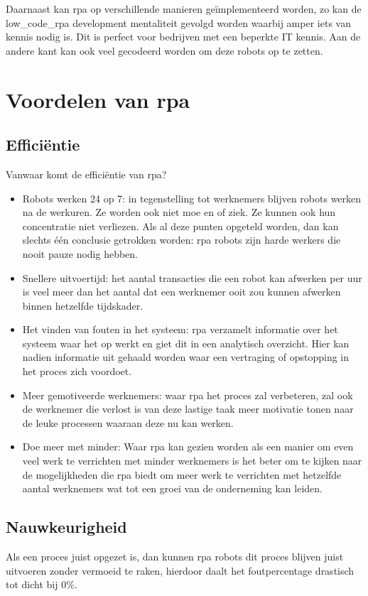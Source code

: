 Daarnaast kan \acrshort{rpa} op verschillende manieren geïmplementeerd worden, zo kan de \gls{low_code_rpa} development mentaliteit gevolgd worden waarbij amper iets van kennis nodig is. Dit is perfect voor bedrijven met een beperkte IT kennis. Aan de andere kant kan ook veel gecodeerd worden om deze robots op te zetten.
\autocite{everythingRPA}

\section{Voordelen van \acrshort{rpa}}

\subsection{Efficiëntie}
Vanwaar komt de efficiëntie van \acrshort{rpa}?
\begin{itemize}
	\item Robots werken 24 op 7: in tegenstelling tot werknemers blijven robots werken na de werkuren. Ze worden ook niet moe en of ziek. Ze kunnen ook hun concentratie niet verliezen. Als al deze punten opgeteld worden, dan kan slechts één conclusie getrokken worden: \acrshort{rpa} robots zijn harde werkers die nooit pauze nodig hebben.
	\item Snellere uitvoertijd: het aantal transacties die een robot kan afwerken per uur is veel meer dan het aantal dat een werknemer ooit zou kunnen afwerken binnen hetzelfde tijdskader.
	\item Het vinden van fouten in het systeem: \acrshort{rpa} verzamelt informatie over het systeem waar het op werkt en giet dit in een analytisch overzicht. Hier kan nadien informatie uit gehaald worden waar een vertraging of opstopping in het proces zich voordoet.
	\item Meer gemotiveerde werknemers: waar \acrshort{rpa} het proces zal verbeteren, zal ook de werknemer die verlost is van deze lastige taak meer motivatie tonen naar de leuke processen waaraan deze nu kan werken.
	\item Doe meer met minder: Waar \acrshort{rpa} kan gezien worden als een manier om even veel werk te verrichten met minder werknemers is het beter om te kijken naar de mogelijkheden die \acrshort{rpa} biedt om meer werk te verrichten met hetzelfde aantal werknemers wat tot een groei van de onderneming kan leiden.
\end{itemize}

\autocite{efficiencyRPA}
\subsection{Nauwkeurigheid}
Als een proces juist opgezet is, dan kunnen \acrshort{rpa} robots dit proces blijven juist uitvoeren zonder vermoeid te raken, hierdoor daalt het foutpercentage drastisch tot dicht bij 0\%. \autocite{efficiencyRPA}

